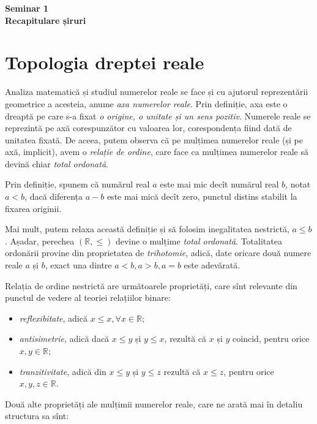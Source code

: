 \documentclass[11pt,a4paper]{article}
\newcommand\id{\indent}
\newcommand\RR{\mathbb{R}}
\theoremstyle{dotless}
\theoremstyle{dotlessdr}
\begin{document}
\begin{center}
  {\large \textbf{Seminar 1 \\ Recapitulare șiruri}}
\end{center}

\vspace{1cm}

\section{Topologia dreptei reale}

\id\id Analiza matematică și studiul numerelor reale se face și cu ajutorul
reprezentării geometrice a acesteia, anume \emph{axa numerelor reale}. Prin
definiție, axa este o dreaptă pe care s-a fixat \emph{o origine, o unitate %
și un sens pozitiv}. Numerele reale se reprezintă pe axă corespunzător cu
valoarea lor, corespondența fiind dată de unitatea fixată. De aceea, putem
observa că pe mulțimea numerelor reale (și pe axă, implicit), avem o
\emph{relație de ordine}, care face ca mulțimea numerelor reale să devină
chiar \emph{total ordonată}.

Prin definiție, spunem că numărul real $a$ este mai mic decît numărul real
$b$, notat $a < b$, dacă diferența $a - b$ este mai mică decît zero, punctul
distins stabilit la fixarea originii.

Mai mult, putem relaxa această definiție și să folosim inegalitatea nestrictă,
$a \leq b$. Așadar, perechea $(\RR, \leq)$ devine o mulțime \emph{total ordonată}.
Totalitatea ordonării provine din proprietatea de \emph{trihotomie}, adică,
date oricare două numere reale $a$ și $b$, exact una dintre $a < b, a > b, a = b$
este adevărată.

Relația de ordine nestrictă are următoarele proprietăți, care sînt relevante
din punctul de vedere al teoriei relațiilor binare:

\begin{itemize}
  \item \emph{reflexibitate}, adică $x \leq x, \forall x \in \RR$;
  \item \emph{antisimetrie}, adică dacă $x \leq y$ și $y \leq x$, rezultă că
    $x$ și $y$ coincid, pentru orice $x, y \in \RR$;
  \item \emph{tranzitivitate}, adică din $x \leq y$ și $y \leq z$ rezultă că
    $x \leq z$, pentru orice $x, y, z \in \RR$.
\end{itemize}

Două alte proprietăți ale mulțimii numerelor reale, care ne arată mai în detaliu
structura sa sînt:
\end{document}

